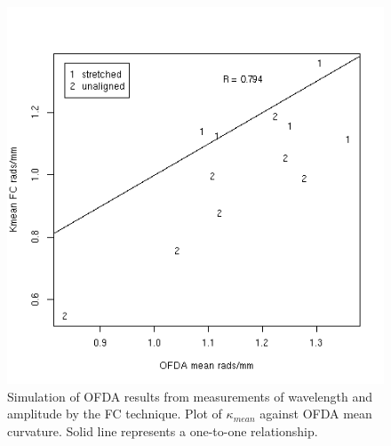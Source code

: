 %

\begin{figure}[!h]
  \centering
  \includegraphics[width=1.0\textwidth]{figofdasimfcmean.png}
  \caption{Simulation of OFDA results from measurements of wavelength and amplitude by the FC technique. Plot of $\kappa_{mean}$ against OFDA mean curvature. Solid line represents a one-to-one relationship.}
\label{fig:ofdasimfcmean}
\end{figure}

%

